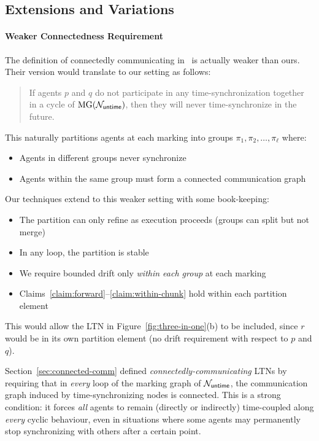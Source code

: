 \subsection{Extensions and Variations}
\label{sec:weaker-connected-comm}

\paragraph*{Weaker Connectedness Requirement}

The definition of connectedly communicating in~\cite{DBLP:conf/fsttcs/MadhusudanTY05} is actually weaker than ours. Their version would translate to our setting as follows:

\begin{quote}
If agents $p$ and $q$ do not participate in any time-synchronization together in a cycle of $\operatorname{MG}(\mathcal{N}_{\mathsf{untime}})$, then they will never time-synchronize in the future.
\end{quote}

This naturally partitions agents at each marking into groups $\pi_1, \pi_2, \ldots, \pi_\ell$ where:
\begin{itemize}
\item Agents in different groups never synchronize
\item Agents within the same group must form a connected communication graph
\end{itemize}

Our techniques extend to this weaker setting with some book-keeping:
\begin{itemize}
\item The partition can only refine as execution proceeds (groups can split but not merge)
\item In any loop, the partition is stable
\item We require bounded drift only \emph{within each group} at each marking
\item Claims~\ref{claim:forward}--\ref{claim:within-chunk} hold within each partition element
\end{itemize}

This would allow the LTN in Figure~\ref{fig:three-in-one}(b) to be included, since $r$ would be in its own partition element (no drift requirement with respect to $p$ and $q$).

Section~\ref{sec:connected-comm} defined \emph{connectedly-communicating} LTNs by requiring that in \emph{every} loop of the marking graph of $\mathcal{N}_{\mathsf{untime}}$, the communication graph induced by time-synchronizing nodes is connected. This is a strong condition: it forces \emph{all} agents to remain (directly or indirectly) time-coupled along \emph{every} cyclic behaviour, even in situations where some agents may permanently stop synchronizing with others after a certain point.

